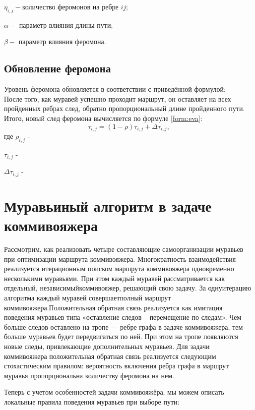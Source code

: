 \documentclass[12pt]{report}
\begin{document}
         $\eta _{i,j} - $количество феромонов на ребре $ij$;
         
          $\alpha - $ параметр влияния длины пути;
          
          $\beta - $ параметр влияния феромона.


\subsection{Обновление феромона}

  Уровень феромона обновляется в соответствии с приведённой формулой:\\
После того, как муравей успешно проходит маршрут, он оставляет на всех пройденных ребрах след, обратно пропорциональный длине пройденного пути. Итого, новый след феромона вычисляется по формуле \ref{form:eva}:
\begin{equation}\label{form:eva} 
    \tau _{i,j}=(1-\rho )\tau _{i,j}+\Delta \tau _{i,j},
\end{equation}
где \quad$ \rho _{i,j}$ -  

    $\tau _{i,j}$ -  
    
    $\Delta \tau _{i,j}$ - 


\section{Муравьиный алгоритм в задаче коммивояжера}
Рассмотрим, как реализовать четыре составляющие самоорганизации муравьев при оптимизации маршрута коммивояжера. Многократность взаимодействия реализуется итерационным поиском маршрута коммивояжера одновременно несколькими муравьями. При этом каждый муравей рассматривается как отдельный, независимыйкоммивояжер, решающий свою задачу. За однуитерацию алгоритма каждый муравей совершаетполный маршрут коммивояжера.Положительная обратная связь реализуется как имитация поведения муравьев типа «оставление следов – перемещение по следам». Чем больше следов оставлено на тропе — ребре графа в задаче коммивояжера, тем больше муравьев будет передвигаться по ней. При этом на тропе появляются новые следы, привлекающие дополнительных муравьев. Для задачи коммивояжера положительная обратная связь реализуется следующим стохастическим правилом: вероятность включения ребра графа в маршрут муравья пропорциональна количеству феромона на нем.
		
Теперь с учетом особенностей задачи коммивояжёра, мы можем описать локальные правила поведения муравьев при выборе пути:
\end{document}
